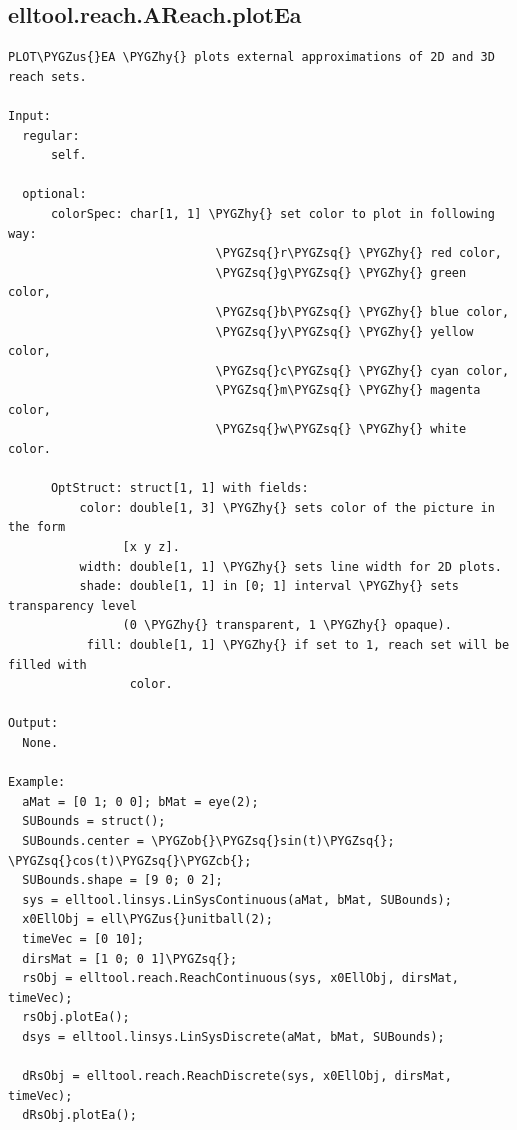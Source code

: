 \documentclass[letterpaper,10pt,english]{sphinxmanual}
\def\PYGZus{\char`\_}
\def\PYGZob{\char`\{}
\def\PYGZcb{\char`\}}
\def\PYGZhy{\char`\-}
\def\PYGZsq{\char`\'}
\begin{document}
\subsection{elltool.reach.AReach.plotEa}
\label{chap_functions:elltool-reach-areach-plotea}
\begin{Verbatim}[commandchars=\\\{\}]
PLOT\PYGZus{}EA \PYGZhy{} plots external approximations of 2D and 3D reach sets.

Input:
  regular:
      self.

  optional:
      colorSpec: char[1, 1] \PYGZhy{} set color to plot in following way:
                             \PYGZsq{}r\PYGZsq{} \PYGZhy{} red color,
                             \PYGZsq{}g\PYGZsq{} \PYGZhy{} green color,
                             \PYGZsq{}b\PYGZsq{} \PYGZhy{} blue color,
                             \PYGZsq{}y\PYGZsq{} \PYGZhy{} yellow color,
                             \PYGZsq{}c\PYGZsq{} \PYGZhy{} cyan color,
                             \PYGZsq{}m\PYGZsq{} \PYGZhy{} magenta color,
                             \PYGZsq{}w\PYGZsq{} \PYGZhy{} white color.

      OptStruct: struct[1, 1] with fields:
          color: double[1, 3] \PYGZhy{} sets color of the picture in the form
                [x y z].
          width: double[1, 1] \PYGZhy{} sets line width for 2D plots.
          shade: double[1, 1] in [0; 1] interval \PYGZhy{} sets transparency level
                (0 \PYGZhy{} transparent, 1 \PYGZhy{} opaque).
           fill: double[1, 1] \PYGZhy{} if set to 1, reach set will be filled with
                 color.

Output:
  None.

Example:
  aMat = [0 1; 0 0]; bMat = eye(2);
  SUBounds = struct();
  SUBounds.center = \PYGZob{}\PYGZsq{}sin(t)\PYGZsq{}; \PYGZsq{}cos(t)\PYGZsq{}\PYGZcb{};
  SUBounds.shape = [9 0; 0 2];
  sys = elltool.linsys.LinSysContinuous(aMat, bMat, SUBounds);
  x0EllObj = ell\PYGZus{}unitball(2);
  timeVec = [0 10];
  dirsMat = [1 0; 0 1]\PYGZsq{};
  rsObj = elltool.reach.ReachContinuous(sys, x0EllObj, dirsMat, timeVec);
  rsObj.plotEa();
  dsys = elltool.linsys.LinSysDiscrete(aMat, bMat, SUBounds);

  dRsObj = elltool.reach.ReachDiscrete(sys, x0EllObj, dirsMat, timeVec);
  dRsObj.plotEa();
\end{Verbatim}
\end{document}
